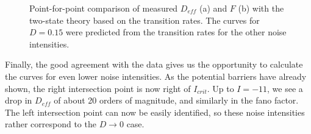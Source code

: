 \documentclass[12pt,a4paper]{article}
\begin{document}
\begin{figure}[H]
	\hspace*{-0.5cm}
	\caption{Point-for-point comparison of measured $D_{eff}$ (a) and $F$ (b) with the two-state theory based on the transition rates. The curves for $D=0.15$ were predicted from the transition rates for the other noise intensities.}
\end{figure}
Finally, the good agreement with the data gives us the opportunity to calculate the curves for even lower noise intensities. As the potential barriers have already shown, the right intersection point is now right of $I_{crit}$. Up to $I=-11$, we see a drop in $D_{eff}$ of about 20 orders of magnitude, and similarly in the fano factor. The left intersection point can now be easily identified, so these noise intensities rather correspond to the $D\rightarrow0$ case.
\end{document}
